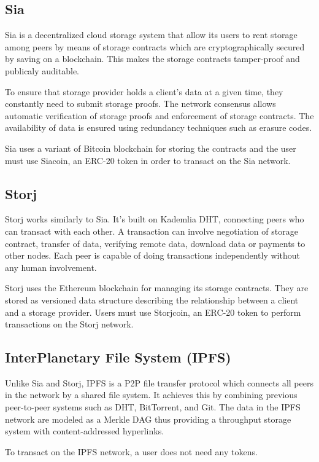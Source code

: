 \documentclass[]{report}
\begin{document}
		\subsection*{Sia}
			Sia\cite{vorick2014sia} is a decentralized cloud storage system that allow its users to rent storage among peers by means of storage contracts which are cryptographically secured by saving on a blockchain. This makes the storage contracts tamper-proof and publicaly auditable.
			
			To ensure that storage provider holds a client’s data at a given time, they constantly need to submit storage proofs. The network consensus allows automatic verification of storage proofs and enforcement of storage contracts. The availability of data is ensured using redundancy techniques such as erasure codes.
			
			Sia uses a variant of Bitcoin blockchain for storing the contracts and the user must use Siacoin, an ERC-20 token in order to transact on the Sia network.
		
		\subsection*{Storj}
			Storj works similarly to Sia. It's built on Kademlia DHT, connecting peers who can transact with each other. A transaction can involve negotiation of storage contract, transfer of data, verifying remote data, download data or payments to other nodes. Each peer is capable of doing transactions independently without any human involvement.
			
			Storj uses the Ethereum blockchain for managing its storage contracts. They are stored as versioned data structure describing the relationship between a client and a storage provider. Users must use Storjcoin, an ERC-20 token to perform transactions on the Storj network. 
		
		\subsection*{InterPlanetary File System (IPFS)}
			Unlike Sia and Storj, IPFS is a P2P file transfer protocol which connects all peers in the network by a shared file system. It achieves this by combining previous peer-to-peer systems such as DHT, BitTorrent, and Git. The data in the IPFS network are modeled as a Merkle DAG thus providing a throughput storage system with content-addressed hyperlinks.
			
			To transact on the IPFS network, a user does not need any tokens.
	
\end{document}
